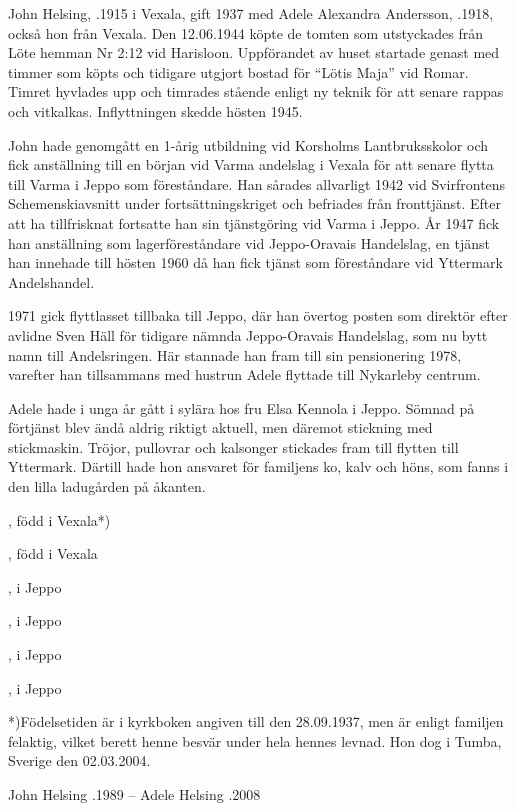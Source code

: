 John Helsing, .1915 i Vexala, gift 1937 med Adele Alexandra Andersson, .1918, också hon från Vexala. Den 12.06.1944  köpte de tomten som utstyckades från Löte hemman Nr 2:12 vid Harisloon. Uppförandet av huset startade genast med timmer som 	köpts och tidigare utgjort bostad för ``Lötis Maja'' vid Romar. Timret hyvlades upp och timrades stående enligt ny teknik för att senare 	rappas och vitkalkas. Inflyttningen skedde hösten 1945.

John hade genomgått en 1-årig utbildning vid Korsholms Lantbruksskolor och fick anställning till en början vid Varma andelslag i	Vexala för att senare flytta till Varma i Jeppo som föreståndare. Han sårades allvarligt 1942 vid Svirfrontens Schemenskiavsnitt	under fortsättningskriget och befriades från fronttjänst. Efter att ha tillfrisknat fortsatte han sin tjänstgöring vid Varma i Jeppo. År 1947	fick han anställning som lagerföreståndare vid Jeppo-Oravais Handelslag, en tjänst han innehade till hösten 1960 då han fick tjänst som 	föreståndare vid Yttermark Andelshandel.

1971 gick flyttlasset tillbaka till Jeppo, där han övertog posten som	direktör efter avlidne Sven Häll för tidigare nämnda Jeppo-Oravais	Handelslag, som nu bytt namn till Andelsringen. Här stannade han	fram till sin pensionering 1978, varefter han tillsammans med hustrun Adele flyttade till Nykarleby centrum.

Adele hade i unga år gått i sylära hos fru Elsa Kennola i Jeppo.	Sömnad på förtjänst blev ändå aldrig riktigt aktuell, men däremot	stickning med stickmaskin. Tröjor, pullovrar och kalsonger stickades fram till flytten till Yttermark. Därtill hade hon ansvaret för familjens ko, kalv och höns, som fanns i den lilla ladugården på åkanten.
\begin{jhchildren}
  \item {}, född i Vexala*)
  \item {}, född i Vexala
  \item {}, i Jeppo
  \item {}, i Jeppo
  \item {}, i Jeppo
  \item {}, i Jeppo
\end{jhchildren}

*)Födelsetiden är i kyrkboken angiven till den 28.09.1937, men är	enligt familjen felaktig, vilket berett henne besvär under hela hennes	levnad. Hon dog i Tumba, Sverige den 02.03.2004.

John Helsing .1989  --  Adele Helsing .2008

